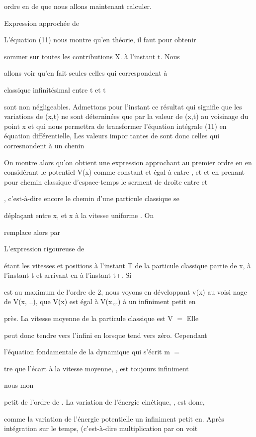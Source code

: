 ordre en  de  que nous allons maintenant calculer.

Expression approchée de 

L'équation (11) nous montre qu'en théorie, il faut pour obtenir

sommer sur toutes les contributions X. à l'instant t. Nous

allons voir qu'en fait seules celles qui correspondent à

%
classique infinitésimal entre t et t

sont non négligeables. Admettons pour l'instant ce résultat qui signifie
que les variations de (x,t) ne sont déterninées que par la valeur de
(x,t) au voisinage du point x et qui nous permettra de transformer
l'équation intégrale (11) en équation différentielle, Les valeurs impor
tantes de  sont donc celles qui corresnondent à un chenin


On montre alors qu'on obtient une expression approchant
 au premier ordre en  en considérant le potentiel V(x)
comme constant et égal à  entre , et  et en prenant pour
chemin classique d'espace-temps le serment de droite entre  et

, c'est-à-dire encore le chemin d'une particule classique se

déplaçant entre x, et x à la vitesse uniforme . On

remplace alors  par 

L'expression rigoureuse de 

étant les vitesses et positions à l'instant T de la particule classique partie de x, à l'instant t et arrivant en à l'instant t+. Si 

est au maximum de l'ordre de 2, nous voyons en développant v(x) au voisi
nage de V(x, ..), que V(x) est égal à V(x,,.) à un infiniment petit en 

près. La vitesse moyenne de la particule classique est V $=$  Elle

peut donc tendre vers l'infini en  lorsque  tend vers zéro. Cependant

l'équation fondamentale de la dynamique qui s'écrit m  $=$

tre que l'écart à la vitesse moyenne,  , est toujours infiniment

nous mon

petit de l'ordre de . La variation de l'énergie cinétique, , est donc,

comme la variation de l'énergie potentielle un infiniment petit en.
Après intégration sur le temps, (c'est-à-dire multiplication par on voit


